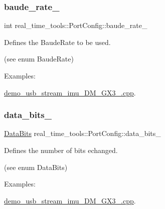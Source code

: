 \subsubsection{\texorpdfstring{baude\+\_\+rate\+\_\+}{baude\_rate\_}}
{\footnotesize\ttfamily int real\+\_\+time\+\_\+tools\+::\+Port\+Config\+::baude\+\_\+rate\+\_\+}



Defines the Baude\+Rate to be used. 

(see enum Baude\+Rate) \begin{Desc}
\item[Examples\+: ]\par
\hyperlink{demo_usb_stream_imu_3DM_GX3_25_8cpp-example}{demo\+\_\+usb\+\_\+stream\+\_\+imu\+\_\+D\+M\+\_\+\+G\+X3\+\_.\+cpp}.\end{Desc}
\mbox{\label{classreal__time__tools_1_1PortConfig_af80f9991e3811392385208a9baf9c6fd}} 
\subsubsection{\texorpdfstring{data\+\_\+bits\+\_\+}{data\_bits\_}}
{\footnotesize\ttfamily \hyperlink{classreal__time__tools_1_1PortConfig_a11e818aa26cd0a941ff00b9ccd4d2131}{Data\+Bits} real\+\_\+time\+\_\+tools\+::\+Port\+Config\+::data\+\_\+bits\+\_\+}



Defines the number of bits echanged. 

(see enum Data\+Bits) \begin{Desc}
\item[Examples\+: ]\par
\hyperlink{demo_usb_stream_imu_3DM_GX3_25_8cpp-example}{demo\+\_\+usb\+\_\+stream\+\_\+imu\+\_\+D\+M\+\_\+\+G\+X3\+\_.\+cpp}.\end{Desc}
\mbox{\label{classreal__time__tools_1_1PortConfig_ad89a20459faf7718a63ea8c00ddc5e34}} 
